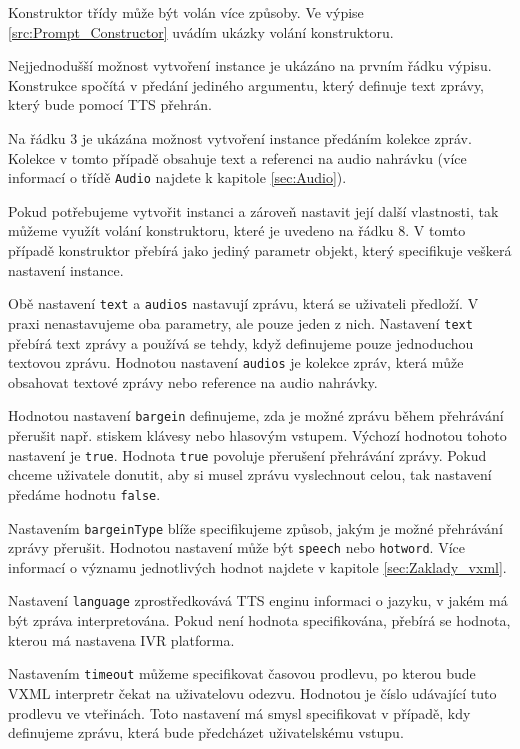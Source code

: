 \documentclass[ing,male,java,dept460]{diploma}						%
\begin{document}
Konstruktor třídy může být volán více způsoby. Ve výpise \ref{src:Prompt_Constructor} uvádím ukázky volání konstruktoru.



Nejjednodušší možnost vytvoření instance je ukázáno na prvním řádku výpisu. Konstrukce spočítá v předání jediného argumentu, který definuje text zprávy, který bude pomocí TTS přehrán.

Na řádku 3 je ukázána možnost vytvoření instance předáním kolekce zpráv. Kolekce v tomto případě obsahuje text a referenci na audio nahrávku (více informací o třídě \texttt{Audio} najdete k kapitole \ref{sec:Audio}).

Pokud potřebujeme vytvořit instanci a zároveň nastavit její další vlastnosti, tak můžeme využít volání konstruktoru, které je uvedeno na řádku 8. V tomto případě konstruktor přebírá jako jediný parametr objekt, který specifikuje veškerá nastavení instance.

Obě nastavení \texttt{text} a \texttt{audios} nastavují zprávu, která se uživateli předloží. V praxi nenastavujeme oba parametry, ale pouze jeden z nich. Nastavení \texttt{text} přebírá text zprávy a používá se tehdy, když definujeme pouze jednoduchou textovou zprávu. Hodnotou nastavení \texttt{audios} je kolekce zpráv, která může obsahovat textové zprávy nebo reference na audio nahrávky.

Hodnotou nastavení \texttt{bargein} definujeme, zda je možné zprávu během přehrávání přerušit např. stiskem klávesy nebo hlasovým vstupem. Výchozí hodnotou tohoto nastavení je \texttt{true}. Hodnota \texttt{true} povoluje přerušení přehrávání zprávy. Pokud chceme uživatele donutit, aby si musel zprávu vyslechnout celou, tak nastavení předáme hodnotu \texttt{false}.

Nastavením \texttt{bargeinType} blíže specifikujeme způsob, jakým je možné přehrávání zprávy přerušit. Hodnotou nastavení může být \texttt{speech} nebo \texttt{hotword}. Více informací o významu jednotlivých hodnot najdete v kapitole \ref{sec:Zaklady_vxml}.

Nastavení \texttt{language} zprostředkovává TTS enginu informaci o jazyku, v jakém má být zpráva interpretována. Pokud není hodnota specifikována, přebírá se hodnota, kterou má nastavena IVR platforma.

Nastavením \texttt{timeout} můžeme specifikovat časovou prodlevu, po kterou bude VXML interpretr čekat na uživatelovu odezvu. Hodnotou je číslo udávající tuto prodlevu ve vteřinách. Toto nastavení má smysl specifikovat v případě, kdy definujeme zprávu, která bude předcházet uživatelskému vstupu.
\end{document}
